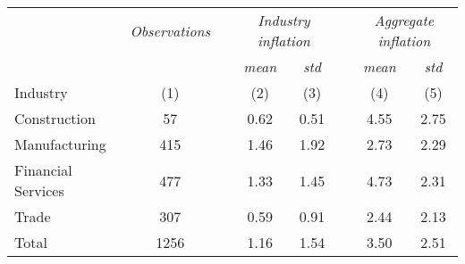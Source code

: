 \begin{tabular}{lccccccc} \hline\hline
& \emph{Observations} &  & \multicolumn{2}{c}{\emph{Industry inflation}} &  & \multicolumn{2}{c}{\emph{Aggregate inflation}}\tabularnewline \cline{2-2}\cline{4-5} \cline{7-8}
&  &  & \emph{mean} & \emph{std} &  & \emph{mean} & \emph{std}\\
Industry & (1) & & (2) & (3) & & (4) & (5) \\ \hline
Construction       &  57 & & 0.62 & 0.51 & & 4.55 & 2.75 \\
Manufacturing      &  415 & & 1.46 & 1.92 & & 2.73 & 2.29 \\
Financial Services &  477 & & 1.33 & 1.45 & & 4.73 & 2.31 \\
Trade              &  307 & & 0.59 & 0.91 & & 2.44 & 2.13 \\ \hline
Total              &  1256 & & 1.16 & 1.54 & & 3.50 & 2.51 \\ \hline\hline
\end{tabular}
